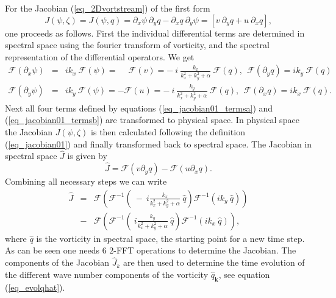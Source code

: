 For the Jacobian (\ref{eq_2Dvortstream}) of the first form
\begin{equation} \label{eq_jacobian01}
  J(\psi,\zeta) 
   = 
  J(\psi,q) 
   = 
  \partial_{x} \psi \ \partial_{y} q 
   -   
  \partial_{x} q \ \partial_{y} \psi
   =
  \left[ v \ \partial_{y} q  + u \ \partial_{x} q \right],
\end{equation}
one proceeds as follows. First the individual differential terms 
are determined in spectral space using the fourier transform of 
vorticity, and the spectral representation of the differential 
operators. We get
\begin{eqnarray} \label{eq_jacobian01_termsa}
  \mathcal{F}(\partial_{x} \psi)
  &=& 
  i  k_{x} \ \mathcal{F}(\psi)
   =
  \phantom{-} \mathcal{F}(v)
   = 
  - \ i \ \frac{k_{x}}{k^{2}_{x} + k^{2}_{y} + \alpha} \ 
  \mathcal{F}(q),
  \ \ 
  \mathcal{F}(\partial_{y} q)
   = 
  i k_{y} \ \mathcal{F}(q) \ \ \
  \\ \label{eq_jacobian01_termsb}
  \mathcal{F}(\partial_{y} \psi)
  &=&
  i  k_{y} \ \mathcal{F}(\psi)
   =
  - \mathcal{F}(u)
   = 
  - \ i \ \frac{k_{y}}{k^{2}_{x} + k^{2}_{y} + \alpha} \ 
  \mathcal{F}(q),
  \ \
  \mathcal{F}(\partial_{x} q)
   = 
  i k_{x} \ \mathcal{F}(q). \ \ \ 
\end{eqnarray}
Next all four terms defined by equations (\ref{eq_jacobian01_termsa}) 
and (\ref{eq_jacobian01_termsb}) are transformed to physical space. 
In physical space the Jacobian $J(\psi,\zeta)$ is then 
calculated following the definition (\ref{eq_jacobian01}) and finally
transformed back to spectral space. The Jacobian in spectral space 
$\hat{J}$ is given by
\begin{equation} \label{eq_jacobian01_J}
  \hat{J} 
   = 
  \mathcal{F}(v \partial_{y} q)
   -
  \mathcal{F}(u \partial_{x} q).
\end{equation}
Combining all necessary steps we can write
\begin{eqnarray} \nonumber
  \hat{J} 
   &=&
  \mathcal{F}
   \left(
    \mathcal{F}^{-1} 
     \left(
      \ - \ i \frac{k_{x}}{k^{2}_{x}+k^{2}_{y}+\alpha} \ 
      \hat{q}
     \right) 
    \mathcal{F}^{-1} 
     \left(
      ik_{y} \ \hat{q}
     \right)
   \right)
    \\ \label{eq_jacobian01_Jall}
   &-&
  \mathcal{F}
   \left(
    \mathcal{F}^{-1} 
     \left(
     \ i \frac{k_{y}}{k^{2}_{x}+k^{2}_{y}+\alpha} \ 
      \hat{q}
     \right) 
    \mathcal{F}^{-1}
     \left(
      ik_{x} \ \hat{q}
     \right)
   \right),
\end{eqnarray}
where $\hat{q}$ is the vorticity in spectral space, the starting point
for a new time step. As can be seen one needs $6$ $2$-FFT operations
to determine the Jacobian. The components of the Jacobian 
$\hat{J}_{k}$ are then used to determine the time 
evolution of the different wave number components of the vorticity 
$\hat{q}_{\mathbf{k}}$, see equation (\ref{eq_evolqhat}). 

